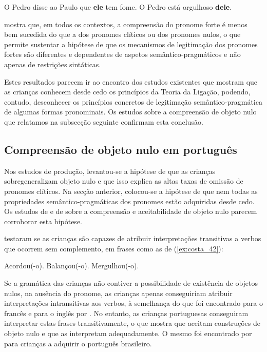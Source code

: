 \documentclass[output=paper]{LSP/langsci}
\begin{document}
\ea\label{ex:costa_40}
O Pedro disse ao Paulo que \textbf{ele} tem fome.
\z
\ea\label{ex:costa_41}
O Pedro está orgulhoso \textbf{dele}.
\z

\citet{silva2015} mostra que, em todos os contextos, a compreensão do pronome forte é menos bem sucedida do que a dos pronomes clíticos ou dos pronomes nulos, o que permite sustentar a hipótese de que os mecanismos de legitimação dos pronomes fortes são diferentes e dependentes de aspetos semântico-pragmáticos e não apenas de restrições sintáticas.

Estes resultados parecem ir ao encontro dos estudos existentes que mostram que as crianças conhecem desde cedo os princípios da Teoria da Ligação, podendo, contudo, desconhecer os princípios concretos de legitimação semântico-pragmática de algumas formas pronominais. Os estudos sobre a compreensão de objeto nulo que relatamos na subsecção seguinte confirmam esta conclusão.

\subsection{Compreensão de objeto nulo em português}
\label{subsec:costa_compreensao_obj_nulo}

Nos estudos de produção, levantou-se a hipótese de que as crianças sobregeneralizam objeto nulo e que isso explica as altas taxas de omissão de pronomes clíticos. Na secção anterior, colocou-se a hipótese de que nem todas as propriedades semântico-pragmáticas dos pronomes estão adquiridas desde cedo. Os estudos de \citet{costalobo2009,costalobo2010} e de \citet{costagrolla_etal2015} sobre a compreensão e aceitabilidade de objeto nulo parecem corroborar esta hipótese.

\citet{costalobo2009} testaram se as crianças são capazes de atribuir interpretações transitivas a verbos que ocorrem sem complemento, em frases como as de (\ref{ex:costa_42}):

\ea\label{ex:costa_42}
\ea\label{ex:costa_42a} Acordou(-o).
\ex\label{ex:costa_42b} Balançou(-o).
\ex\label{ex:costa_42c} Mergulhou(-o).
\zl

Se a gramática das crianças não contiver a possibilidade de existência de objetos nulos, na ausência do pronome, as crianças apenas conseguiriam atribuir interpretações intransitivas aos verbos, à semelhança do que foi encontrado para o francês e para o inglês por \citet{gruter2006}. No entanto, as crianças portuguesas conseguiram interpretar estas frases transitivamente, o que mostra que aceitam construções de objeto nulo e que as interpretam adequadamente. O mesmo foi encontrado por \citet{costagrolla_etal2015} para crianças a adquirir o português brasileiro.
\end{document}
